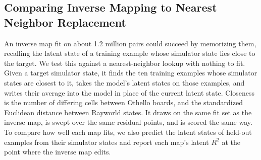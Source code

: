 \documentclass{article} %
\newcommand{\red}[1]{\textcolor{red}{#1}}
\begin{document}


\FloatBarrier
\subsection{Comparing Inverse Mapping to Nearest Neighbor Replacement}
\label{app:inverse_nearest_neighbor}

An inverse map fit on about 1.2 million pairs could succeed by memorizing them, recalling the latent state of a training example whose simulator state lies close to the target. We test this against a nearest-neighbor lookup with nothing to fit. Given a target simulator state, it finds the ten training examples whose simulator states are closest to it, takes the model's latent states on those examples, and writes their average into the model in place of the current latent state. Closeness is the number of differing cells between Othello boards, and the standardized Euclidean distance between Rayworld states. It draws on the same fit set as the inverse map, is swept over the same residual points, and is scored the same way. To compare how well each map fits, we also predict the latent states of held-out examples from their simulator states and report each map's latent $R^2$ at the point where the inverse map edits.
\end{document}
